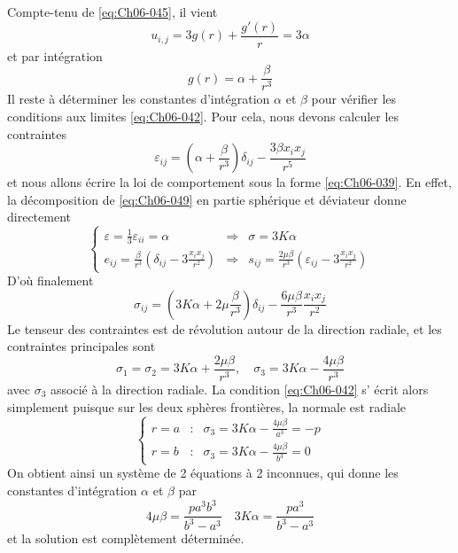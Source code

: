 Compte-tenu de \eqref{eq:Ch06-045}, il vient
\begin{equation}
    u_{i,j} = 3 g(r) + \frac{g'(r)}{r} = 3 \alpha
    \label{eq:Ch06-047}
\end{equation}
et par intégration
\begin{equation}
    g(r) = \alpha + \frac{\beta}{r^3}
    \label{eq:Ch06-048}
\end{equation}
Il reste à déterminer les constantes d'intégration $\alpha$ et $\beta$ pour vérifier les conditions aux limites \eqref{eq:Ch06-042}.
Pour cela, nous devons calculer les contraintes
\begin{equation}
    \varepsilon_{ij} = \left( \alpha + \frac{\beta}{r^3} \right)\delta_{ij} - \frac{3\beta x_i x_j}{r^5}
    \label{eq:Ch06-049}
\end{equation}
et nous allons écrire la loi de comportement sous la forme \eqref{eq:Ch06-039}.
En effet, la décomposition de \eqref{eq:Ch06-049} en partie sphérique et déviateur donne directement
\begin{equation}
    \left\{
    \begin{aligned}
        \varepsilon = \frac{1}{3} \varepsilon_{ii} = \alpha & \Rightarrow & \sigma = 3K  \alpha \\
        e_{ij} = \frac{\beta}{r^3} \left( \delta_{ij} - 3 \frac{x_ix_j}{r^2} \right) & \Rightarrow & s_{ij} = \frac{2\mu\beta}{r^3} \left( \varepsilon_{ij} - 3 \frac{x_i x_j}{r^2} \right)
    \end{aligned}
    \right.
    \label{eq:Ch06-050}
\end{equation}
D'où finalement
\begin{equation}
    \sigma_{ij} = \left( 3K\alpha + 2\mu \frac{\beta}{r^3} \right) \delta_{ij} - \frac{6\mu\beta}{r^3} \frac{x_ix_j}{r^2}
    \label{eq:Ch06-051}
\end{equation}
Le tenseur des contraintes est de révolution autour de la direction radiale, et les contraintes principales sont
\begin{equation}
    \sigma_1 = \sigma_2 = 3 K \alpha + \frac{2\mu\beta}{r^3}, \quad \sigma_3 = 3 K \alpha - \frac{4\mu\beta}{r^3}
    \label{eq:Ch06-052}
\end{equation}
avec $\sigma_3$ associé à la direction radiale.
La condition \eqref{eq:Ch06-042} s' écrit alors simplement puisque sur les deux sphères frontières, la normale est radiale
\begin{equation}
    \left\{
    \begin{aligned}
        r=a & : & \sigma_3 = 3K\alpha - \frac{4\mu\beta}{a^3} = -p \\
        r=b & : & \sigma_3 = 3K\alpha - \frac{4\mu\beta}{b^3} = 0
    \end{aligned}
    \right.
    \label{eq:Ch06-053}
\end{equation}
On obtient ainsi un système de 2 équations à 2 inconnues, qui donne les constantes d'intégration $\alpha$ et $\beta$ par
\begin{equation}
    4\mu\beta = \frac{pa^3b^3}{b^3-a^3} \quad 3K\alpha = \frac{p a^3}{b^3-a^3}
    \label{eq:Ch06-054}
\end{equation}
et la solution est complètement déterminée.

